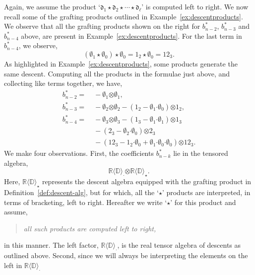 \documentclass[5p,twocolumn]{elsarticle}
\newcommand*{\R}{\mathbb R}
\newcommand*{\df}{\mathfrak d}
\newcommand*{\cendot}{\boldsymbol{\cdot}}
\newcommand*{\botimes}{\boldsymbol{\otimes}}
\begin{document}
Again, we assume the product `$\df_1\star\df_2\star\cdots\star\df_\ell$' is computed left to right.
We now recall some of the grafting products outlined in Example~\ref{ex:descentproducts}. 
We observe that all the grafting products shown on the right for $b_{n-2}^\ast$, $b_{n-3}^\ast$ and $b_{n-4}^\ast$ above, are present in Example~\ref{ex:descentproducts}.
For the last term in $b_{n-4}^\ast$, we observe,
\begin{equation*}
(\emptyset_1\star\emptyset_0)\star\emptyset_0=1_2\star\emptyset_0=12_3.
\end{equation*}
As highlighted in Example~\ref{ex:descentproducts}, some products generate the same descent.
Computing all the products in the formulae just above, and collecting like terms together, we have,
\begin{subequations}\label{eq:bnkcoeffs}
\begin{align}
  b^\ast_{n-2}=&\;-\emptyset_1\botimes\emptyset_1,\label{eq:bn2dg}\\
  b^\ast_{n-3}=&\;-\emptyset_2\botimes\emptyset_2-(1_2-\emptyset_1\cendot\emptyset_0)\botimes1_2,\label{eq:bn3dg}\\
  b^\ast_{n-4}=&\;-\emptyset_3\botimes\emptyset_3-(1_3-\emptyset_1\cendot\emptyset_1)\botimes1_3\nonumber\\
         &\;-(2_3-\emptyset_2\cendot\emptyset_0)\botimes2_3\nonumber\\
         &\;-(12_3-1_2\cendot\emptyset_0+\emptyset_1\cendot\emptyset_0\cendot\emptyset_0)\botimes12_3.\label{eq:bn4dg}
\end{align}
\end{subequations}
We make four observations. First, the coefficients $b^\ast_{n-k}$ lie in the tensored algebra,
\begin{equation*}
      \R\langle\mathbb D\rangle_{\cendot}\botimes\R\langle\mathbb D\rangle_{\star}.
\end{equation*}
Here, $\R\langle\mathbb D\rangle_{\star}$ represents the descent algebra equipped with the grafting product in Definition~\ref{def:descent-alg},
but for which, all the `$\star$' products are interpreted, in terms of bracketing, left to right.
Hereafter we write `$\star$' for this product and assume,
\begin{quote}
\emph{all such products are computed left to right,} 
\end{quote}
in this manner.
The left factor, $\R\langle\mathbb D\rangle_{\cendot}$, is the real tensor algebra of descents as outlined above.
Second, since we will always be interpreting the elements on the left in $\R\langle\mathbb D\rangle_{\cendot}$
\end{document}
